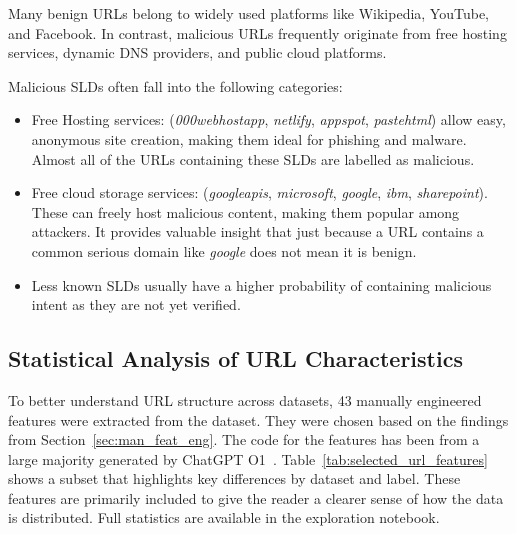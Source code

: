 Many benign URLs belong to widely used platforms like Wikipedia, YouTube, and Facebook. In contrast, malicious URLs frequently originate from free hosting services, dynamic DNS providers, and public cloud platforms.

Malicious SLDs often fall into the following categories:
\begin{itemize}
    \item Free Hosting services: (\textit{000webhostapp}, \textit{netlify}, \textit{appspot}, \textit{pastehtml}) allow easy, anonymous site creation, making them ideal for phishing and malware. Almost all of the URLs containing these SLDs are labelled as malicious.
    \item Free cloud storage services: (\textit{googleapis}, \textit{microsoft}, \textit{google}, \textit{ibm}, \textit{sharepoint}). These can freely host malicious content, making them popular among attackers. It provides valuable insight that just because a URL contains a common serious domain like \textit{google} does not mean it is benign.
    \item Less known SLDs usually have a higher probability of containing malicious intent as they are not yet verified.
\end{itemize}

\subsection{Statistical Analysis of URL Characteristics}
\label{sec:statistical_analysis_url}

To better understand URL structure across datasets, 43 manually engineered features were extracted from the dataset. They were chosen based on the findings from Section~\ref{sec:man_feat_eng}. The code for the features has been from a large majority generated by ChatGPT O1~\cite{openai2025features}. Table~\ref{tab:selected_url_features} shows a subset that highlights key differences by dataset and label. These features are primarily included to give the reader a clearer sense of how the data is distributed. Full statistics are available in the exploration notebook.

